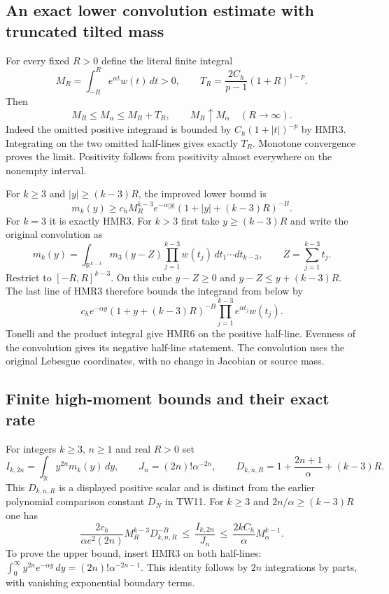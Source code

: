 \documentclass[11pt,a4paper]{article}
\begin{document}
\subsection{An exact lower convolution estimate with truncated tilted mass}

For every fixed $R>0$ define the literal finite integral
\[
 M_R=\int_{-R}^{R}e^{\alpha t}w(t)\,dt>0,\qquad
 T_R=\frac{2C_h}{p-1}(1+R)^{1-p}.
 \tag{HMR4}
\]
Then
\[
 M_R\leq M_\alpha\leq M_R+T_R,\qquad
 M_R\uparrow M_\alpha\quad(R\longrightarrow\infty).
 \tag{HMR5}
\]
Indeed the omitted positive integrand is bounded by
$C_h(1+|t|)^{-p}$ by HMR3. Integrating on the two omitted
half-lines gives exactly $T_R$. Monotone convergence proves
the limit. Positivity follows from positivity almost everywhere
on the nonempty interval.

For $k\geq3$ and $|y|\geq(k-3)R$, the improved lower bound is
\[
 \boxed{\displaystyle
 m_k(y)\geq c_h M_R^{k-3}e^{-\alpha|y|}
                  (1+|y|+(k-3)R)^{-B}.}
 \tag{HMR6}
\]
For $k=3$ it is exactly HMR3. For $k>3$ first take
$y\geq(k-3)R$ and write the original convolution as
\[
 m_k(y)=\int_{\mathbb R^{k-3}}
       m_3(y-Z)\prod_{j=1}^{k-3}w(t_j)\,dt_1\cdots dt_{k-3},
 \qquad Z=\sum_{j=1}^{k-3}t_j.
\]
Restrict to $[-R,R]^{k-3}$. On this cube
$y-Z\geq0$ and $y-Z\leq y+(k-3)R$. The last line of HMR3
therefore bounds the integrand from below by
\[
 c_he^{-\alpha y}(1+y+(k-3)R)^{-B}
                    \prod_{j=1}^{k-3}e^{\alpha t_j}w(t_j).
\]
Tonelli and the product integral give HMR6 on the positive
half-line. Evenness of the convolution gives its negative
half-line statement. The convolution uses the original
Lebesgue coordinates, with no change in Jacobian or source mass.

\subsection{Finite high-moment bounds and their exact rate}

For integers $k\geq3$, $n\geq1$ and real $R>0$ set
\[
 I_{k,2n}=\int_{\mathbb R}y^{2n}m_k(y)\,dy,\qquad
 J_n=(2n)!\alpha^{-2n},\qquad
 D_{k,n,R}=1+\frac{2n+1}{\alpha}+(k-3)R.
 \tag{HMR7}
\]
This $D_{k,n,R}$ is a displayed positive scalar and is distinct
from the earlier polynomial comparison constant $D_N$ in TW11.
For $k\geq3$ and $2n/\alpha\geq(k-3)R$ one has
\[
 \boxed{\displaystyle
 \frac{2c_h}{\alpha e^2(2n)}
       M_R^{k-3}D_{k,n,R}^{-B}
 \ \leq\ \frac{I_{k,2n}}{J_n}\
 \leq\ \frac{2kC_h}{\alpha}M_\alpha^{k-1}.}
 \tag{HMR8}
\]
To prove the upper bound, insert HMR3 on both half-lines:
$\int_0^\infty y^{2n}e^{-\alpha y}\,dy
=(2n)!\alpha^{-2n-1}$. This identity follows by
$2n$ integrations by parts, with vanishing exponential
boundary terms.
\end{document}
